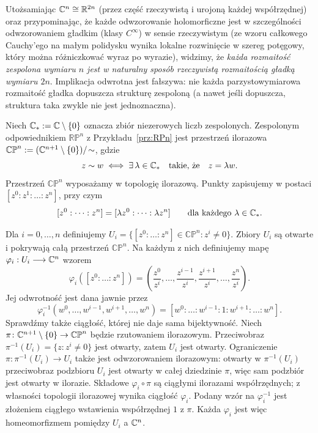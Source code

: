 \begin{uwaga}
Utożsamiając $\mathbb{C}^n\cong\mathbb{R}^{2n}$ (przez część rzeczywistą i urojoną każdej współrzędnej)
oraz przypominając, że każde odwzorowanie holomorficzne jest w szczególności odwzorowaniem
gładkim (klasy $C^\infty$) w sensie rzeczywistym (ze wzoru całkowego
Cauchy'ego na małym polidysku wynika lokalne rozwinięcie w szereg potęgowy,
który można różniczkować wyraz po wyrazie), widzimy, że \emph{każda rozmaitość zespolona
wymiaru $n$ jest w naturalny sposób rzeczywistą rozmaitością gładką wymiaru $2n$}. Implikacja
odwrotna jest fałszywa: nie każda parzystowymiarowa rozmaitość gładka dopuszcza strukturę
zespoloną (a nawet jeśli dopuszcza, struktura taka zwykle nie jest jednoznaczna).
\end{uwaga}

\begin{przyklad}
Niech $\mathbb{C}_*:=\mathbb{C}\setminus\{0\}$ oznacza zbiór niezerowych
liczb zespolonych.
Zespolonym odpowiednikiem $\mathbb{RP}^n$ z
Przykładu~\ref{prz:RPn} jest przestrzeń ilorazowa $\mathbb{CP}^n := (\mathbb{C}^{n+1}\setminus\{0\})/\!\sim$,
gdzie
\[
z\sim w
\iff
\exists\,\lambda\in\mathbb{C}_*
\quad\text{takie, że}\quad
z=\lambda w.
\]
Przestrzeń $\mathbb{CP}^n$ wyposażamy w topologię ilorazową.
Punkty zapisujemy w postaci $[z^0:z^1:\dots:z^n]$,
przy czym
\[
[z^0:\dots:z^n]
=
[\lambda z^0:\dots:\lambda z^n]
\qquad
\text{dla każdego }\lambda\in\mathbb{C}_*.
\]

Dla $i=0,\dots,n$ definiujemy $U_i = \{[z^0:\dots:z^n]\in\mathbb{CP}^n:z^i\neq0\}$.
Zbiory $U_i$ są otwarte i pokrywają całą przestrzeń $\mathbb{CP}^n$.
Na każdym z nich definiujemy mapę $\varphi_i:U_i\longrightarrow\mathbb{C}^n$
wzorem
\[
\varphi_i([z^0:\dots:z^n])
=
\left(
\frac{z^0}{z^i},
\dots,
\frac{z^{i-1}}{z^i},
\frac{z^{i+1}}{z^i},
\dots,
\frac{z^n}{z^i}
\right).
\]
Jej odwrotność jest dana jawnie przez
\[
\varphi_i^{-1}
(w^0,\dots,w^{i-1},w^{i+1},\dots,w^n)
=
[w^0:\dots:w^{i-1}:1:w^{i+1}:\dots:w^n].
\]
Sprawdźmy także ciągłość, której nie daje sama bijektywność.
Niech $\pi\colon\mathbb{C}^{n+1}\setminus\{0\}\to\mathbb{CP}^n$ będzie
rzutowaniem ilorazowym. Przeciwobraz $\pi^{-1}(U_i)=\{z:z^i\ne0\}$
jest otwarty, zatem $U_i$ jest otwarty. Ograniczenie
$\pi\colon\pi^{-1}(U_i)\to U_i$ także jest odwzorowaniem ilorazowym:
otwarty w $\pi^{-1}(U_i)$ przeciwobraz podzbioru $U_i$ jest otwarty
w całej dziedzinie $\pi$, więc sam podzbiór jest otwarty w ilorazie.
Składowe $\varphi_i\circ\pi$ są ciągłymi ilorazami współrzędnych;
z własności topologii ilorazowej wynika ciągłość $\varphi_i$.
Podany wzór na $\varphi_i^{-1}$ jest złożeniem ciągłego wstawienia
współrzędnej $1$ z $\pi$. Każda $\varphi_i$ jest więc homeomorfizmem
pomiędzy $U_i$ a $\mathbb{C}^n$.


\end{przyklad}
